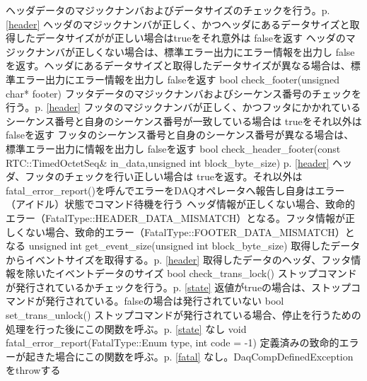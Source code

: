 \documentclass[a4j,10pt,dvips,onecolumn,oneside,final]{jarticle}%
\begin{document}
       {ヘッダデータのマジックナンバおよびデータサイズのチェックを行う。p.\pageref{header} \ref{header}}
       {ヘッダのマジックナンバが正しく、かつヘッダにあるデータサイズと取得したデータサイズがが正しい場合はtrueをそれ意外は falseを返す}
       {ヘッダのマジックナンバが正しくない場合は、標準エラー出力にエラー情報を出力し falseを返す。ヘッダにあるデータサイズと取得したデータサイズが異なる場合は、標準エラー出力にエラー情報を出力し falseを返す}
       {bool check\_footer(unsigned char{*} footer) }
       {フッタデータのマジックナンバおよびシーケンス番号のチェックを行う。p.\pageref{header} \ref{header}}
       {フッタのマジックナンバが正しく、かつフッタにかかれているシーケンス番号と自身のシーケンス番号が一致している場合は trueをそれ以外は falseを返す}
       {フッタのシーケンス番号と自身のシーケンス番号が異なる場合は、標準エラー出力に情報を出力し falseを返す}
       {bool check\_header\_footer(const RTC::TimedOctetSeq\& in\_data,unsigned int block\_byte\_size)}
       {p.\pageref{header} \ref{header}}
       {ヘッダ、フッタのチェックを行い正しい場合は trueを返す。それ以外は fatal\_error\_report()を呼んでエラーをDAQオペレータへ報告し自身はエラー（アイドル）状態でコマンド待機を行う}
       {ヘッダ情報が正しくない場合、致命的エラー（FatalType::HEADER\_DATA\_MISMATCH）となる。フッタ情報が正しくない場合、致命的エラー（FatalType::FOOTER\_DATA\_MISMATCH）となる}
       {unsigned int get\_event\_size(unsigned int block\_byte\_size) }
       {取得したデータからイベントサイズを取得する。p.\pageref{header} \ref{header}}
       {取得したデータのヘッダ、フッタ情報を除いたイベントデータのサイズ}
       {}
       {bool check\_trans\_lock() }
       {ストップコマンドが発行されているかチェックを行う。p.\pageref{state} \ref{state}}
       {返値がtrueの場合は、ストップコマンドが発行されている。falseの場合は発行されていない}
       {}
       {bool set\_trans\_unlock() }
       {ストップコマンドが発行されている場合、停止を行うための処理を行った後にこの関数を呼ぶ。p.\pageref{state} \ref{state}}
       {なし}
       {}
       {void fatal\_error\_report(FatalType::Enum type, int code = -1) }
       {定義済みの致命的エラーが起きた場合にこの関数を呼ぶ。p.\pageref{fatal} \ref{fatal}}
       {なし。DaqCompDefinedExceptionをthrowする}
       {}
\end{document}
